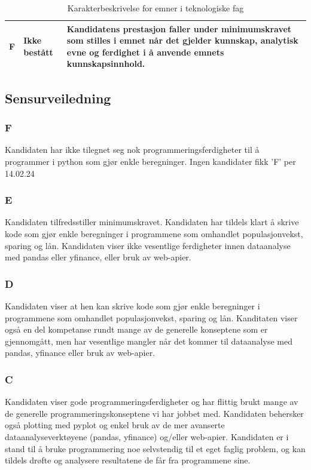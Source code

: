 \documentclass[12pt, titlepage]{article}
\begin{document}
\begin{table}[h!]
\begin{center}
\begin{tabular}{|l|l|p{12cm}|}
      \hline
      F & Ikke bestått & Kandidatens prestasjon faller under minimumskravet som stilles i emnet når det gjelder kunnskap, analytisk evne og ferdighet i å anvende emnets kunnskapsinnhold. \\
      \hline
   \end{tabular}
   \end{center}
   \caption{Karakterbeskrivelse for emner i teknologiske fag}\label{tab:karakterbeskrivelse}
\end{table}

\newpage
\subsection*{Sensurveiledning}
\subsubsection*{F}
Kandidaten har ikke tilegnet seg nok programmeringsferdigheter til å programmer i python som gjør enkle beregninger. Ingen kandidater fikk 'F' per 14.02.24

\subsubsection*{E}
Kandidaten tilfredsstiller minimumskravet. Kandidaten har tildels klart å skrive kode som gjør enkle beregninger i programmene som omhandlet populasjonvekst, sparing og lån.
Kandidaten viser ikke vesentlige ferdigheter innen dataanalyse med pandas eller yfinance, eller bruk av web-apier.

\subsubsection*{D}
Kandidaten viser at hen kan skrive kode som gjør enkle beregninger i programmene som omhandlet populasjonvekst, sparing og lån. 
Kanditaten viser også en del kompetanse rundt mange av de generelle konseptene som er gjennomgått, men har vesentlige mangler når det kommer
til dataanalyse med pandas, yfinance eller bruk av web-apier.

\subsubsection*{C}
Kandidaten viser gode programmeringsferdigheter og har flittig brukt mange av de generelle programmeringskonseptene vi har jobbet med. 
Kandidaten behersker også plotting med pyplot og enkel bruk av de mer avanserte dataanalyseverktøyene (pandas, yfinance) og/eller web-apier. Kandidaten er i stand
til å bruke programmering noe selvstendig til et eget faglig problem, og kan tildels drøfte og analysere resultatene de får fra programmene sine.
\end{document}

